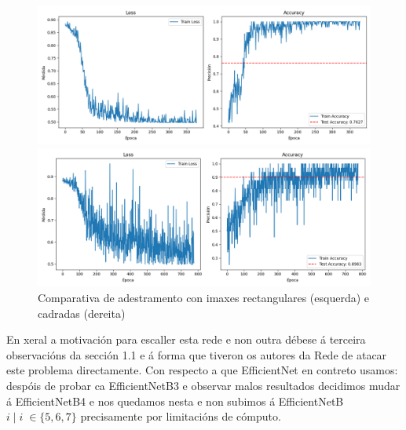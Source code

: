 \documentclass{article}
\begin{document}
\begin{itemize}
\begin{figure}[h]
	\centering
	\begin{minipage}{0.45\textwidth}
		\centering
		\includegraphics[width=\linewidth]{rectangulo.png}
	\end{minipage}
	\hfill
	\begin{minipage}{0.45\textwidth}
		\centering
		\includegraphics[width=\linewidth]{cadrado.png}
	\end{minipage}
	\label{fig:comparativa}
	\caption{Comparativa de adestramento con imaxes rectangulares (esquerda) e cadradas (dereita)}
\end{figure}






En xeral a motivación para escaller esta rede e non outra débese á terceira observacións da sección 1.1 e á forma que tiveron os autores da Rede de atacar este problema directamente. Con respecto a que EfficientNet en contreto usamos: despóis de probar ca EfficientNetB3 e observar malos resultados decidimos mudar á EfficientNetB4 e nos quedamos nesta e non subimos á EfficientNetB$i \; |\; i\; \in \{5,6,7\}$ precisamente por limitacións de cómputo.


\end{itemize}
\end{document}
